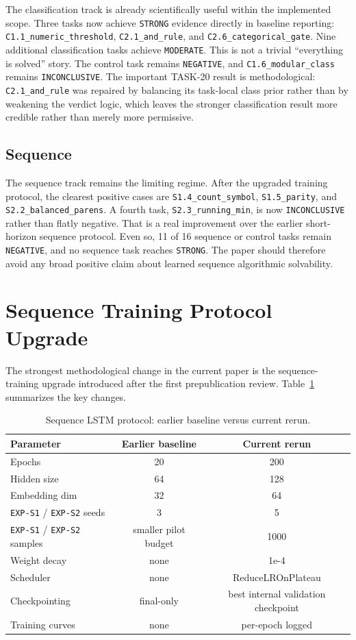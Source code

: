 \documentclass[11pt]{article}
\begin{document}
The classification track is already scientifically useful within the implemented scope. Three tasks now achieve \texttt{STRONG} evidence directly in baseline reporting: \texttt{C1.1\_numeric\_threshold}, \texttt{C2.1\_and\_rule}, and \texttt{C2.6\_categorical\_gate}. Nine additional classification tasks achieve \texttt{MODERATE}. This is not a trivial ``everything is solved'' story. The control task remains \texttt{NEGATIVE}, and \texttt{C1.6\_modular\_class} remains \texttt{INCONCLUSIVE}. The important TASK-20 result is methodological: \texttt{C2.1\_and\_rule} was repaired by balancing its task-local class prior rather than by weakening the verdict logic, which leaves the stronger classification result more credible rather than merely more permissive.

\subsection{Sequence}

The sequence track remains the limiting regime. After the upgraded training protocol, the clearest positive cases are \texttt{S1.4\_count\_symbol}, \texttt{S1.5\_parity}, and \texttt{S2.2\_balanced\_parens}. A fourth task, \texttt{S2.3\_running\_min}, is now \texttt{INCONCLUSIVE} rather than flatly negative. That is a real improvement over the earlier short-horizon sequence protocol. Even so, 11 of 16 sequence or control tasks remain \texttt{NEGATIVE}, and no sequence task reaches \texttt{STRONG}. The paper should therefore avoid any broad positive claim about learned sequence algorithmic solvability.

\section{Sequence Training Protocol Upgrade}

The strongest methodological change in the current paper is the sequence-training upgrade introduced after the first prepublication review. Table~\ref{tab:protocol} summarizes the key changes.

\begin{table}[H]
\centering
\caption{Sequence LSTM protocol: earlier baseline versus current rerun.}
\label{tab:protocol}
\begin{tabular}{lcc}
\toprule
Parameter & Earlier baseline & Current rerun \\
\midrule
Epochs & 20 & 200 \\
Hidden size & 64 & 128 \\
Embedding dim & 32 & 64 \\
\texttt{EXP-S1} / \texttt{EXP-S2} seeds & 3 & 5 \\
\texttt{EXP-S1} / \texttt{EXP-S2} samples & smaller pilot budget & 1000 \\
Weight decay & none & 1e-4 \\
Scheduler & none & ReduceLROnPlateau \\
Checkpointing & final-only & best internal validation checkpoint \\
Training curves & none & per-epoch logged \\
\bottomrule
\end{tabular}
\end{table}
\end{document}
